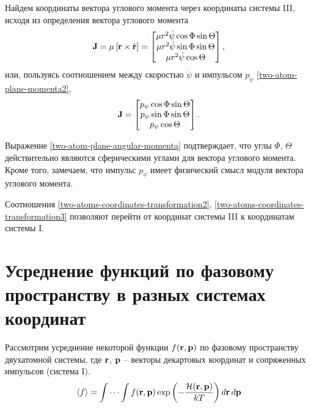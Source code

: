 Найдем координаты вектора углового момента через координаты системы III, исходя из определения вектора углового момента 
\begin{gather}
    \mathbf{J} = \mu \left[ \mathbf{r} \times \dot{\mathbf{r}} \right] = 
    \begin{bmatrix}
        \mu r^2 \dot{\psi} \cos \Phi \sin \Theta \\ 
        \mu r^2 \dot{\psi} \sin \Phi \sin \Theta \\
        \mu r^2 \dot{\psi} \cos \Theta
    \end{bmatrix},
\end{gather}
или, пользуясь соотношением между скоростью $\dot{\psi}$ и импульсом $p_\psi$ \eqref{two-atom-plane-momenta2}, 
\begin{gather}
    \mathbf{J} = 
    \begin{bmatrix}
        p_\psi \cos \Phi \sin \Theta \\
        p_\psi \sin \Phi \sin \Theta \\
        p_\psi \cos \Theta
    \end{bmatrix}. \label{two-atom-plane-angular-momenta}
\end{gather}

Выражение \eqref{two-atom-plane-angular-momenta} подтверждает, что углы $\Phi$, $\Theta$ действительно являются сферическими углами для вектора углового момента. Кроме того, замечаем, что импульс $p_\psi$ имеет физический смысл модуля вектора углового момента. \par
    Соотношения \eqref{two-atoms-coordinates-transformation2}, \eqref{two-atoms-coordinates-transformation3} позволяют перейти от координат системы III к координатам системы I.    
    \color{red}{Понадобятся ли все остальные переходы?}
\color{black}{}

\section{Усреднение функций по фазовому пространству в разных системах координат}

Рассмотрим усреднение некоторой функции $f(\mathbf{r}, \mathbf{p})$ по фазовому пространству двухатомной системы, где $\mathbf{r}$, $\mathbf{p}$ -- векторы декартовых координат и сопряженных импульсов (система I). 
\begin{gather}
    \langle f \rangle = \idotsint f(\mathbf{r}, \mathbf{p}) \exp \left( -\frac{\mathcal{H}(\mathbf{r},\mathbf{p})}{kT} \right) d \mathbf{r} \, d\mathbf{p} \label{two-atom-mean}
\end{gather}

